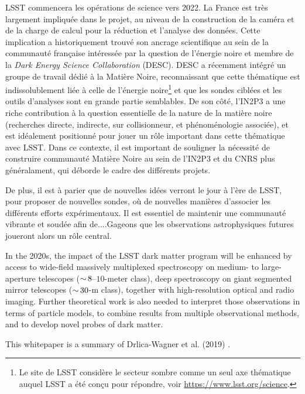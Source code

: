 \documentclass[12pt]{article}
\begin{document}
LSST commencera les opérations de science vers 2022. La France est très largement impliquée dans le projet, au niveau de la construction de la caméra et de la charge de calcul pour la réduction et l'analyse des données. Cette implication a historiquement trouvé son ancrage scientifique au sein de la communauté française intéressée par la question de l'énergie noire et membre de la {\it Dark Energy Science Collaboration} (DESC). DESC a récemment intégré un groupe de travail dédié à la Matière Noire, reconnaissant que cette thématique est indissolublement liée à celle de l'énergie noire\footnote{Le site de LSST considère le secteur sombre comme un seul axe thématique auquel LSST a été conçu pour répondre, voir \href{https://www.lsst.org/science}{https://www.lsst.org/science}. } et que les sondes ciblées et les outils d'analyses sont en grande partie semblables.
De son côté, l'IN2P3 a une riche contribution à la question essentielle de la nature de la matière noire (recherches directe, indirecte, sur collisionneur, et phénoménologie associée), et est idéalement positionné pour jouer un rôle important dans cette thématique avec LSST. Dans ce contexte, il est important de souligner la nécessité de construire communauté Matière Noire au sein de l'IN2P3 et du CNRS plus généralament, qui déborde le cadre des différents projets. 

De plus, il est à parier que de nouvelles idées verront le jour à l'ère de LSST, pour proposer de nouvelles sondes, où de nouvelles manières d'associer les différents efforts expérimentaux. Il est essentiel de maintenir une communauté vibrante et soudée afin de....Gageons que les observations astrophysiques futures joueront alors un rôle central.

In the 2020s, the impact of the LSST dark matter program will be enhanced by access to wide-field massively multiplexed spectroscopy on medium- to large-aperture telescopes ($ {\sim}\, 8$--$10$-meter class), deep spectroscopy on giant segmented mirror telescopes ($ {\sim}\, 30$-m class), together with high-resolution optical and radio imaging.
Further theoretical work is also needed to interpret those observations in terms of particle models, to combine results from multiple observational methods, and to develop novel probes of dark matter.

This whitepaper is a summary of Drlica-Wagner et al. (2019) \citep{drlica-wagner_2019_lsst_dark_matter}.


\def\bibname{References}
\begingroup
  \small
  \setlength{\bibsep}{0pt plus 0.5ex}
  
  
\endgroup

\end{document}
